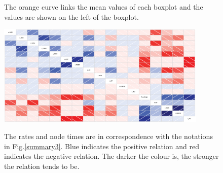\documentclass{bmcart}
\begin{document}
\begin{backmatter}
\begin{figure}[h!]
\centering
{}
\caption{
             The orange curve links the mean values of each boxplot and the values are shown on the left of the boxplot.}
\label{eff_comp2}
\end{figure}

\begin{figure}[h!]
\includegraphics[width=10cm]{rateandtime.eps}\\
\caption{
             The rates and node times are in correspondence with the notations in Fig.\ref{summary3}. Blue indicates the positive relation and red indicates the negative relation. The darker the colour is, the stronger the relation tends to be.}
\label{correlation}
\end{figure}


\end{backmatter}
\end{document}
